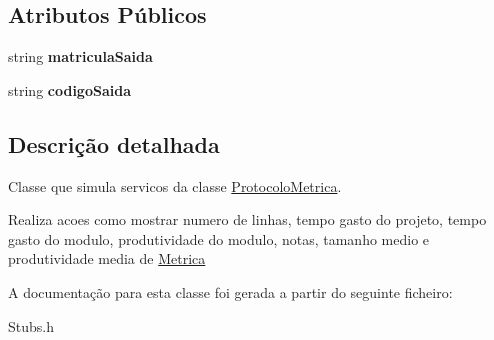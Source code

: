 \subsection*{\-Atributos \-Públicos}
\begin{DoxyCompactItemize}
\item 
\hypertarget{class_stub_metrica_ad3b26cd73c746e124cc8dcbae5fe6edf}{
string {\bfseries matricula\-Saida}}
\label{class_stub_metrica_ad3b26cd73c746e124cc8dcbae5fe6edf}

\item 
\hypertarget{class_stub_metrica_a5b84795353049d9b12c252d77c837a54}{
string {\bfseries codigo\-Saida}}
\label{class_stub_metrica_a5b84795353049d9b12c252d77c837a54}

\end{DoxyCompactItemize}


\subsection{\-Descrição detalhada}
\-Classe que simula servicos da classe \hyperlink{class_protocolo_metrica}{\-Protocolo\-Metrica}. 

\-Realiza acoes como mostrar numero de linhas, tempo gasto do projeto, tempo gasto do modulo, produtividade do modulo, notas, tamanho medio e produtividade media de \hyperlink{class_metrica}{\-Metrica} 

\-A documentação para esta classe foi gerada a partir do seguinte ficheiro\-:\begin{DoxyCompactItemize}
\item 
\-Stubs.\-h\end{DoxyCompactItemize}
